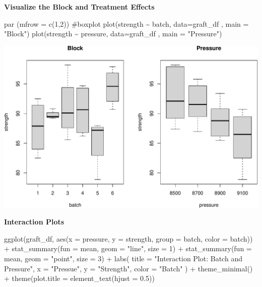 \documentclass[
  letterpaper,
]{scrbook}
\newenvironment{Shaded}{\begin{snugshade}}{\end{snugshade}}
\newcommand{\AttributeTok}[1]{\textcolor[rgb]{0.40,0.45,0.13}{#1}}
\newcommand{\CommentTok}[1]{\textcolor[rgb]{0.37,0.37,0.37}{#1}}
\newcommand{\DecValTok}[1]{\textcolor[rgb]{0.68,0.00,0.00}{#1}}
\newcommand{\FloatTok}[1]{\textcolor[rgb]{0.68,0.00,0.00}{#1}}
\newcommand{\FunctionTok}[1]{\textcolor[rgb]{0.28,0.35,0.67}{#1}}
\newcommand{\NormalTok}[1]{\textcolor[rgb]{0.00,0.23,0.31}{#1}}
\newcommand{\SpecialCharTok}[1]{\textcolor[rgb]{0.37,0.37,0.37}{#1}}
\newcommand{\StringTok}[1]{\textcolor[rgb]{0.13,0.47,0.30}{#1}}
\begin{document}
\textbf{Visualize the Block and Treatment Effects}

\begin{Shaded}
\begin{Highlighting}[]
\FunctionTok{par}\NormalTok{ (}\AttributeTok{mfrow =} \FunctionTok{c}\NormalTok{(}\DecValTok{1}\NormalTok{,}\DecValTok{2}\NormalTok{))}
\CommentTok{\#boxplot}
\FunctionTok{plot}\NormalTok{(strength }\SpecialCharTok{\textasciitilde{}}\NormalTok{ batch, }\AttributeTok{data=}\NormalTok{graft\_df , }\AttributeTok{main =} \StringTok{"Block"}\NormalTok{)}
\FunctionTok{plot}\NormalTok{(strength }\SpecialCharTok{\textasciitilde{}}\NormalTok{ pressure, }\AttributeTok{data=}\NormalTok{graft\_df , }\AttributeTok{main =} \StringTok{"Pressure"}\NormalTok{)}
\end{Highlighting}
\end{Shaded}

\includegraphics{unit5-factor/crbd_files/figure-pdf/unnamed-chunk-3-1.pdf}

\textbf{Interaction Plots}

\begin{Shaded}
\begin{Highlighting}[]
\FunctionTok{ggplot}\NormalTok{(graft\_df, }\FunctionTok{aes}\NormalTok{(}\AttributeTok{x =}\NormalTok{ pressure, }\AttributeTok{y =}\NormalTok{ strength, }\AttributeTok{group =}\NormalTok{ batch, }\AttributeTok{color =}\NormalTok{ batch)) }\SpecialCharTok{+}
  \FunctionTok{stat\_summary}\NormalTok{(}\AttributeTok{fun =}\NormalTok{ mean, }\AttributeTok{geom =} \StringTok{"line"}\NormalTok{, }\AttributeTok{size =} \DecValTok{1}\NormalTok{) }\SpecialCharTok{+}
  \FunctionTok{stat\_summary}\NormalTok{(}\AttributeTok{fun =}\NormalTok{ mean, }\AttributeTok{geom =} \StringTok{"point"}\NormalTok{, }\AttributeTok{size =} \DecValTok{3}\NormalTok{) }\SpecialCharTok{+}
  \FunctionTok{labs}\NormalTok{(}
    \AttributeTok{title =} \StringTok{"Interaction Plot: Batch and Pressure"}\NormalTok{,}
    \AttributeTok{x =} \StringTok{"Pressue"}\NormalTok{,}
    \AttributeTok{y =} \StringTok{"Strength"}\NormalTok{,}
    \AttributeTok{color =} \StringTok{"Batch"}
\NormalTok{  ) }\SpecialCharTok{+}
  \FunctionTok{theme\_minimal}\NormalTok{() }\SpecialCharTok{+}
  \FunctionTok{theme}\NormalTok{(}\AttributeTok{plot.title =} \FunctionTok{element\_text}\NormalTok{(}\AttributeTok{hjust =} \FloatTok{0.5}\NormalTok{))}
\end{Highlighting}
\end{Shaded}
\end{document}

